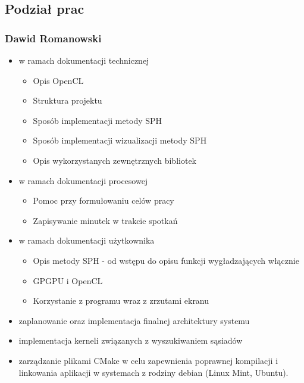 \documentclass[polish, 12pt]{aghthesis}
\begin{document}
	\subsection{Podział prac}
	
		\subsubsection*{Dawid Romanowski} 
		
		\begin{itemize}
		
			\item w ramach dokumentacji technicznej
			
				\begin{itemize}
				
					\item Opis OpenCL
					\item Struktura projektu
					\item Sposób implementacji metody SPH
					\item Sposób implementacji wizualizacji metody SPH
					\item Opis wykorzystanych zewnętrznych bibliotek
				
				\end{itemize}
			
			\item w ramach dokumentacji procesowej
			
				\begin{itemize}
				
					\item Pomoc przy formułowaniu celów pracy
					\item Zapisywanie minutek w trakcie spotkań
				
				\end{itemize}
			
			\item w ramach dokumentacji użytkownika
			
				\begin{itemize}
				
					\item Opis metody SPH - od wstępu do opisu funkcji wygładzających włącznie
					
					\item GPGPU i OpenCL
					
					\item Korzystanie z programu wraz z zrzutami ekranu
				
				\end{itemize}
			
			\item zaplanowanie oraz implementacja finalnej architektury systemu
			
			\item implementacja kerneli związanych z wyszukiwaniem sąsiadów
			
			\item zarządzanie plikami CMake w celu zapewnienia poprawnej kompilacji i linkowania aplikacji w systemach z rodziny debian (Linux Mint, Ubuntu).
		
		\end{itemize}
		
\end{document}
